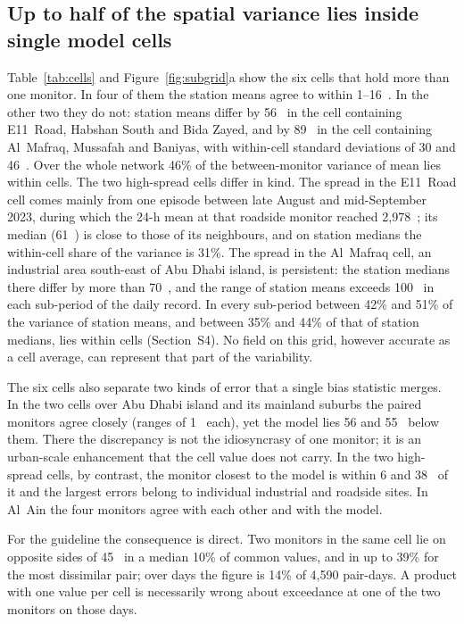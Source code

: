 \subsection{Up to half of the spatial variance lies inside single model cells}
\label{sec:res-subgrid}

Table~\ref{tab:cells} and Figure~\ref{fig:subgrid}a show the six cells that hold more than one
monitor. In four of them the station means agree to within 1--16~\ugm{}. In the other two they do
not: station means differ by 56~\ugm{} in the cell containing E11~Road, Habshan South and Bida
Zayed, and by 89~\ugm{} in the cell containing Al~Mafraq, Mussafah and Baniyas, with within-cell
standard deviations of 30 and 46~\ugm{}. Over the whole network 46\% of the between-monitor
variance of mean \pmten{} lies within cells. The two high-spread cells differ in kind. The spread
in the E11~Road cell comes mainly from one episode between late August and mid-September 2023,
during which the 24-h mean at that roadside monitor reached 2,978~\ugm{}; its median (61~\ugm{})
is close to those of its neighbours, and on station medians the within-cell share of the variance
is 31\%. The spread in the Al~Mafraq cell, an industrial area south-east of Abu Dhabi island, is
persistent: the station medians there differ by more than 70~\ugm{}, and the range of station
means exceeds 100~\ugm{} in each sub-period of the daily record. In every sub-period between 42\%
and 51\% of the variance of station means, and between 35\% and 44\% of that of station medians,
lies within cells (Section~S4). No field on this grid, however accurate as a cell average, can
represent that part of the variability.

The six cells also separate two kinds of error that a single bias statistic merges. In the two
cells over Abu Dhabi island and its mainland suburbs the paired monitors agree closely (ranges of
1~\ugm{} each), yet the model lies 56 and 55~\ugm{} below them. There the discrepancy is not the
idiosyncrasy of one monitor; it is an urban-scale enhancement that the cell value does not carry.
In the two high-spread cells, by contrast, the monitor closest to the model is within 6 and
38~\ugm{} of it and the largest errors belong to individual industrial and roadside sites. In
Al~Ain the four monitors agree with each other and with the model.

For the guideline the consequence is direct. Two monitors in the same cell lie on opposite sides
of 45~\ugm{} in a median 10\% of common values, and in up to 39\% for the most dissimilar pair;
over days the figure is 14\% of 4,590 pair-days. A product with one value per cell is necessarily
wrong about exceedance at one of the two monitors on those days.

